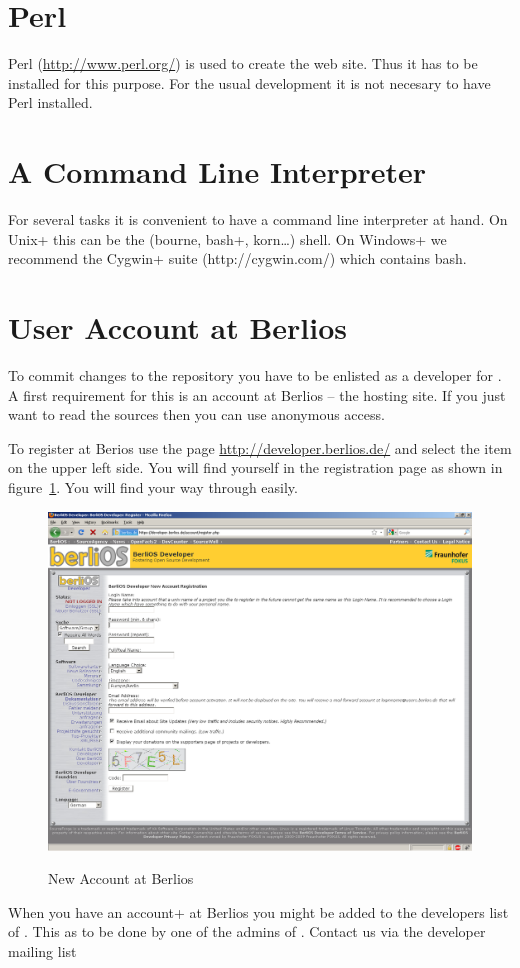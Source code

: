 \section{Perl}

Perl (\url{http://www.perl.org/}) is used to create the web site. Thus
it has to be installed for this purpose. For the usual development it
is not necesary to have Perl installed. 


\section{A Command Line Interpreter}

For several tasks it is convenient to have a command line interpreter
at hand. On \+Unix+ this can be the (bourne,
\+bash+, korn\ldots) shell. On \+Windows+ we
recommend the \+Cygwin+ suite (http://cygwin.com/) which contains
bash.  

\section{User Account at Berlios}

To commit changes to the repository you have to be enlisted as a
developer for \ExTeX. A first requirement for this is an account at
Berlios -- the hosting site. If you just want to read the sources then
you can use anonymous access.

To register at Berios use the page \url{http://developer.berlios.de/}
and select the item  on the upper left side. You
will find yourself in the registration page as shown in
figure~\ref{fig:berlios-register}. You will find your way through
easily.
\begin{figure}[htbp]
  \centering  \includegraphics[scale=.33]{image/berlios-register}
  \caption{New Account at Berlios}\label{fig:berlios-register}
\end{figure}

When you have an \+account+ at Berlios you might be added to the
developers list of \ExTeX. This as to be done by one of the admins of
\ExTeX. Contact us via the developer mailing list 

